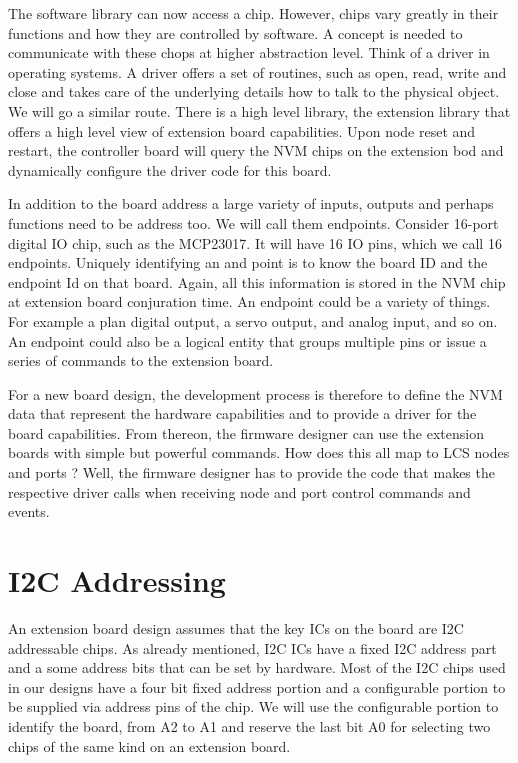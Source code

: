 The software library can now access a chip. However, chips vary greatly in their functions and how they are controlled by software. A concept is needed to communicate with these chops at  higher abstraction level. Think of a driver in operating systems. A driver offers a set of routines, such as open, read, write and close and takes care of the underlying details how to talk to the physical object. We will go a similar route. There is a high level library, the extension library that offers a high level view of extension board capabilities. Upon node reset and restart, the controller board will query the NVM chips on the extension bod and dynamically configure the driver code for this board.

In addition to the board address a large variety of inputs, outputs and perhaps functions need to be address too. We will call them endpoints. Consider  16-port digital IO chip, such as the MCP23017. It will have 16 IO pins, which we call 16 endpoints. Uniquely identifying an and point is to know the board ID and the endpoint Id on that board. Again, all this information is stored in the NVM  chip at extension board conjuration time. An endpoint could be a variety of things. For example a plan digital output, a servo output, and analog input, and so on. An endpoint could also be a logical entity that groups multiple pins or issue a series of commands to the extension board.

For a new board design, the development process is therefore to define the NVM data that represent the hardware capabilities  and to provide a driver for the board capabilities. From thereon, the firmware designer can use the extension boards with simple but powerful commands. How does this all map to LCS nodes and ports ? Well, the firmware designer has to provide the code that makes the respective driver calls when receiving node and port control commands and events.

\section{I2C Addressing}

An extension board design assumes that the key ICs on the board are I2C addressable chips. As already mentioned, I2C ICs have a fixed I2C address part and a some address bits that can be set by hardware. Most of the I2C chips used in our designs have a four bit fixed address portion and a configurable portion to be supplied via address pins of the chip. We will use the configurable portion to identify the board, from A2 to A1 and reserve the last bit A0 for selecting two chips of the same kind on an extension board.


